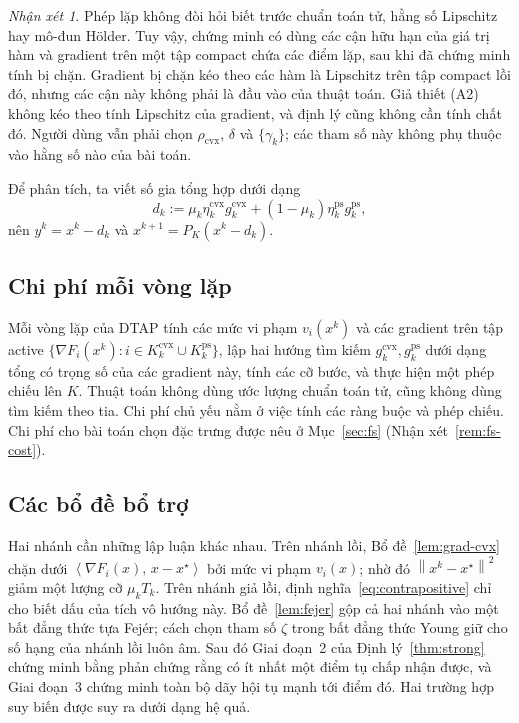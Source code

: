 \documentclass[]{interact}
\theoremstyle{plain}
\theoremstyle{definition}
\theoremstyle{remark}
\newtheorem{remark}{Nhận xét}
\newcommand{\norm}[1]{\left\lVert #1 \right\rVert}
\newcommand{\inner}[2]{\left\langle #1,\, #2 \right\rangle}
\newcommand{\cvx}{\mathrm{cvx}}
\newcommand{\ps}{\mathrm{ps}}
\newcommand{\dtap}{\textsc{DTAP}}
\begin{document}
\begin{remark}\label{rem:regularity-scope}
Phép lặp không đòi hỏi biết trước chuẩn toán tử, hằng số Lipschitz hay
mô-đun H\"older. Tuy vậy, chứng minh có dùng các cận hữu hạn của giá trị hàm và
gradient trên một tập compact chứa các điểm lặp, sau khi đã chứng minh tính bị chặn.
Gradient bị chặn kéo theo các hàm là Lipschitz trên tập compact lồi đó,
nhưng các cận này không phải là đầu vào của thuật toán. Giả thiết (A2) không
kéo theo tính Lipschitz của gradient, và định lý cũng không cần tính chất đó.
Người dùng vẫn phải chọn $\rho_{\cvx}$, $\delta$ và $\{\gamma_k\}$; các tham số này không
phụ thuộc vào hằng số nào của bài toán.
\end{remark}

Để phân tích, ta viết số gia tổng hợp dưới dạng
\begin{equation}\label{eq:dk}
d_k:=\mu_k\eta^{\cvx}_k g^{\cvx}_k+(1-\mu_k)\eta^{\ps}_k g^{\ps}_k,
\end{equation}
nên $y^k=x^k-d_k$ và $x^{k+1}=P_K(x^k-d_k)$.
\subsection{Chi phí mỗi vòng lặp}\label{ssec:complexity}
Mỗi vòng lặp của \dtap{} tính
các mức vi phạm $v_i(x^k)$ và các gradient trên tập active $\{\nabla F_i(x^k):i\in
K^{\cvx}_k\cup K^{\ps}_k\}$, lập hai hướng tìm kiếm $g^{\cvx}_k,g^{\ps}_k$ dưới dạng tổng có trọng số
của các gradient này, tính các cỡ bước, và thực hiện một phép chiếu lên $K$.
Thuật toán không dùng ước lượng chuẩn toán tử, cũng không dùng tìm kiếm theo tia. Chi phí chủ yếu nằm ở
việc tính các ràng buộc và phép chiếu. Chi phí cho bài toán chọn đặc trưng
được nêu ở Mục~\ref{sec:fs}
(Nhận xét~\ref{rem:fs-cost}).

\subsection{Các bổ đề bổ trợ}\label{ssec:aux}
Hai nhánh cần những lập luận khác nhau. Trên nhánh lồi, Bổ đề~\ref{lem:grad-cvx} chặn dưới
$\inner{\nabla F_i(x)}{x-x^\star}$ bởi mức vi phạm $v_i(x)$; nhờ đó $\norm{x^k-x^\star}^2$ giảm
một lượng cỡ $\mu_kT_k$. Trên nhánh giả lồi,
định nghĩa~\eqref{eq:contrapositive} chỉ cho biết dấu của tích vô hướng này.
Bổ đề~\ref{lem:fejer} gộp cả hai nhánh vào một bất đẳng thức tựa Fej\'er; cách chọn
tham số $\zeta$ trong bất đẳng thức Young giữ cho số hạng của nhánh lồi luôn âm. Sau đó Giai đoạn~2 của
Định lý~\ref{thm:strong} chứng minh bằng phản chứng rằng có ít nhất một điểm tụ
chấp nhận được, và Giai đoạn~3 chứng minh toàn bộ dãy hội tụ mạnh tới điểm đó. Hai trường hợp suy biến
được suy ra dưới dạng hệ quả.
\end{document}
